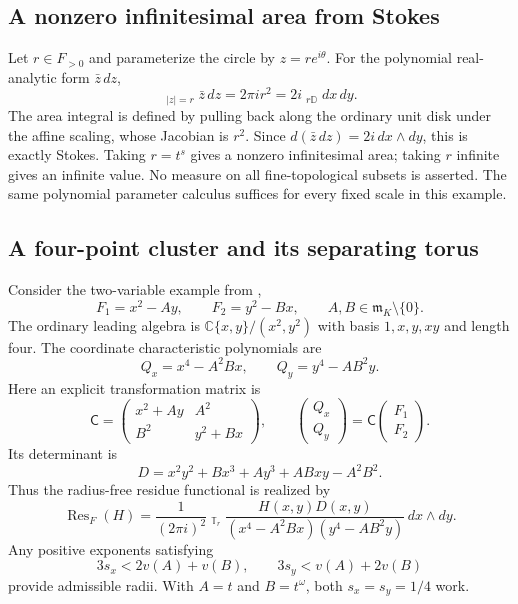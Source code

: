 \documentclass[11pt,letterpaper]{article}
\theoremstyle{definition}
\theoremstyle{remark}
\newcommand{\C}{\mathbb C}
\newcommand{\Q}{\mathbb Q}
\newcommand{\m}{\mathfrak m}
\newcommand{\Res}{\operatorname{Res}}
\newcommand{\HInt}{\mathop{\int^{\!H}}\nolimits}
\newcommand{\HCoint}{\mathop{\oint^{\!H}}\nolimits}
\numberwithin{equation}{section}
\begin{document}
\subsection{A nonzero infinitesimal area from Stokes}
Let $r\in F_{>0}$ and parameterize the circle by $z=r e^{i\theta}$. For the polynomial real-analytic form $\bar z\,dz$,
\begin{equation}\label{eq:areaexample}
\HCoint_{|z|=r}\bar z\,dz
=2\pi i r^2
=2i\HInt_{r\mathbb D}dx\,dy.
\end{equation}
The area integral is defined by pulling back along the ordinary unit disk under the affine scaling, whose Jacobian is $r^2$. Since $d(\bar z\,dz)=2i\,dx\wedge dy$, this is exactly Stokes. Taking $r=t^s$ gives a nonzero infinitesimal area; taking $r$ infinite gives an infinite value. No measure on all fine-topological subsets is asserted. The same polynomial parameter calculus suffices for every fixed scale in this example.

\subsection{A four-point cluster and its separating torus}\label{subsec:fourpoints}
Consider the two-variable example from \cite[\S11]{AG},
\begin{equation}\label{eq:fourF}
F_1=x^2-Ay,\qquad F_2=y^2-Bx,
\qquad A,B\in\m_K\setminus\{0\}.
\end{equation}
The ordinary leading algebra is $\C\{x,y\}/(x^2,y^2)$ with basis $1,x,y,xy$ and length four. The coordinate characteristic polynomials are
\[
Q_x=x^4-A^2Bx,\qquad Q_y=y^4-AB^2y.
\]
Here an explicit transformation matrix is
\begin{equation}\label{eq:exampleC}
\mathsf C=
\begin{pmatrix}
x^2+Ay&A^2\\ B^2&y^2+Bx
\end{pmatrix},\qquad
\begin{pmatrix}Q_x\\Q_y\end{pmatrix}
=\mathsf C\begin{pmatrix}F_1\\F_2\end{pmatrix}.
\end{equation}
Its determinant is
\begin{equation}\label{eq:exampleD}
D=x^2y^2+Bx^3+Ay^3+ABxy-A^2B^2.
\end{equation}
Thus the radius-free residue functional is realized by
\begin{equation}\label{eq:exampletorus}
\Res_F(H)=\frac1{(2\pi i)^2}\HInt_{\mathbb T_r}
 \frac{H(x,y)D(x,y)}{(x^4-A^2Bx)(y^4-AB^2y)}\,dx\wedge dy.
\end{equation}
Any positive exponents satisfying
\[
3s_x<2v(A)+v(B),\qquad 3s_y<v(A)+2v(B)
\]
provide admissible radii. With $A=t$ and $B=t^\omega$, both $s_x=s_y=1/4$ work.
\end{document}
